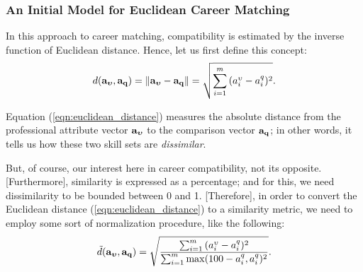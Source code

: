 \documentclass{article}
\begin{document}




\subsubsection{An Initial Model for Euclidean Career Matching}
In this approach to career matching, compatibility is estimated by the inverse function of Euclidean distance. Hence, let us first define this concept:
\begin{gather}
\label{eqn:euclidean_distance}
    d(\vb{a_{\boldsymbol{\upsilon}}}, \vb{a_{q}}) = 
    \norm{\vb{a_{\boldsymbol{\upsilon}}} - \vb{a_{q}}} = 
    \sqrt{
    \sum_{i = 1}^{m}{
    (a_{i}^{\upsilon} - a_{i}^{q})^2
    }
    }
.\end{gather}

Equation (\ref{eqn:euclidean_distance}) measures the absolute distance from the professional attribute vector $\vb{a_{\boldsymbol{\upsilon}}}$ to the comparison vector $\vb{a_{q}}$; in other words, it tells us how these two skill sets are \textit{dissimilar}. 

But, of course, our interest here in career compatibility, not its opposite. [Furthermore], similarity is expressed as a percentage; and for this, we need dissimilarity to be bounded between 0 and 1. [Therefore], in order to convert the Euclidean distance (\ref{eqn:euclidean_distance}) to a similarity metric, we need to employ some sort of normalization procedure, like the following:
\begin{gather}
\label{eqn:normalized_distance}
    \tilde{d}(\vb{a_{\boldsymbol{\upsilon}}}, \vb{a_{q}}) = 
    \sqrt{
    \frac{
    \sum_{i = 1}^{m}{
    (a_{i}^{\upsilon} - a_{i}^{q})^2
    }
    }{
    \sum_{i = 1}^{m}{
    \max(100 - a_{i}^{q}, a_{i}^{q})^2
    }
    }
    }
.\end{gather}
\end{document}
